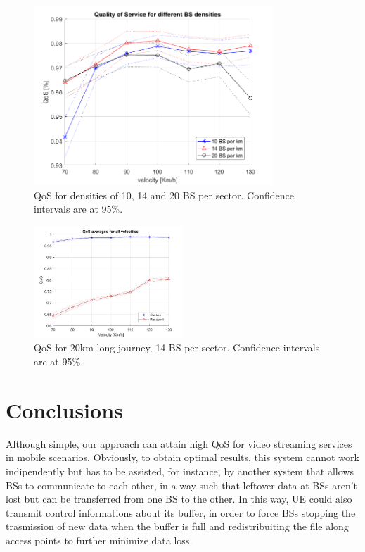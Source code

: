 \documentclass[conference,10pt]{IEEEtran}
\begin{document}
\begin{figure}[t]
	\centering
	\includegraphics[width=9cm]{QoS_10-14-20-BS_densities.png}
	\caption{QoS for densities of 10, 14 and 20 BS per sector. Confidence intervals are at 95\%.}
	\label{fig:QoS_all}
\end{figure}

\begin{figure}[t]
	\centering
	\includegraphics[width=0.5\textwidth]{QoS_20km.jpg}
	\caption{QoS for 20km long journey, 14 BS per sector. Confidence intervals are at 95\%.}
	\label{fig:QoS_20km}
\end{figure}

\section{Conclusions}\label{sec:conclusion}
Although simple, our approach can attain high QoS for video streaming services in mobile scenarios. Obviously, to obtain optimal results, this system cannot work indipendently but has to be assisted, for instance, by another system that allows BSs to communicate to each other, in a way such that leftover data at BSs aren't lost but can be transferred from one BS to the other. In this way, UE could also transmit control informations about its buffer, in order to force BSs stopping the trasmission of new data when the buffer is full and redistribuiting the file along access points  to further minimize data loss.
\end{document}
